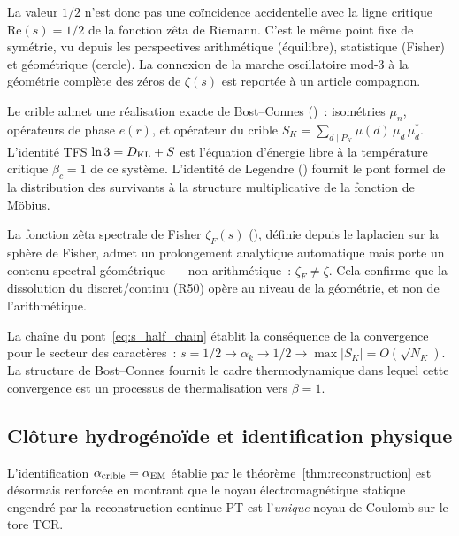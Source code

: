 \documentclass[12pt,a4paper]{article}
\begin{document}
\medskip\noindent
La valeur $1/2$ n'est donc pas une coïncidence accidentelle avec
la ligne critique $\mathrm{Re}(s) = 1/2$ de la fonction zêta de
Riemann. C'est le même point fixe de symétrie, vu depuis les
perspectives arithmétique (équilibre), statistique (Fisher) et
géométrique (cercle). La connexion de la marche oscillatoire
mod-3 à la géométrie complète des zéros de $\zeta(s)$ est reportée
à un article compagnon.

\begin{remarque}\mBR
\label{rem:bc_bridge}
Le crible admet une réalisation exacte de Bost--Connes
(\cite{companion_M4})~: isométries $\mu_n$, opérateurs de phase
$e(r)$, et opérateur du crible
$S_K = \sum_{d \mid P_K} \mu(d)\,\mu_d\,\mu_d^*$. L'identité TFS
$\ln 3 = D_{\rm KL} + S$ est l'équation d'énergie libre à la
température critique $\beta_c = 1$ de ce système. L'identité de
Legendre (\cite{companion_M4}) fournit le pont formel de la
distribution des survivants à la structure multiplicative de la
fonction de M\"obius.

La fonction zêta spectrale de Fisher $\zeta_F(s)$
(\cite{companion_M4}), définie depuis le laplacien sur la sphère
de Fisher, admet un prolongement analytique automatique mais
porte un contenu spectral géométrique~--- non arithmétique~:
$\zeta_F \neq \zeta$. Cela confirme que la dissolution du
discret/continu (R50) opère au niveau de la géométrie, et non de
l'arithmétique.

La chaîne du pont~\eqref{eq:s_half_chain} établit la conséquence
de la convergence pour le secteur des caractères~:
$s = 1/2 \to \alpha_k \to 1/2 \to \max|S_K| = O(\sqrt{N_K})$.
La structure de Bost--Connes fournit le cadre thermodynamique dans
lequel cette convergence est un processus de thermalisation vers
$\beta = 1$.
\end{remarque}

\subsection{Clôture hydrogénoïde et identification physique}
\label{sec:ch9_hydrogenic}

L'identification $\alpha_{\rm crible} = \alpha_{\rm EM}$ établie
par le théorème~\ref{thm:reconstruction} est désormais renforcée
en montrant que le noyau électromagnétique statique engendré par
la reconstruction continue PT est l'\emph{unique} noyau de Coulomb
sur le tore TCR.
\end{document}
